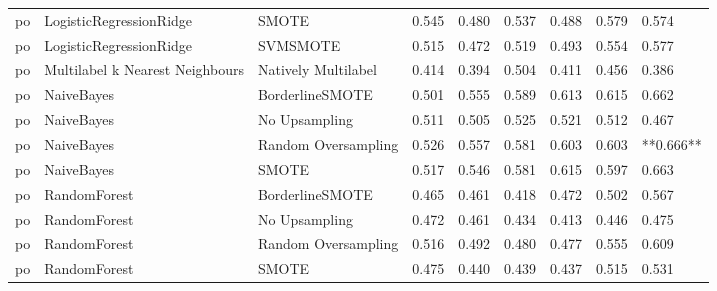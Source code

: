 \begin{tabular}{lllllllll}
      po &         LogisticRegressionRidge &                         SMOTE & 0.545 &                     0.480 &                 0.537 &                  0.488 &                                   0.579 &     0.574 \\
      po &         LogisticRegressionRidge &                      SVMSMOTE & 0.515 &                     0.472 &                 0.519 &                  0.493 &                                   0.554 &     0.577 \\
      po & Multilabel k Nearest Neighbours &           Natively Multilabel & 0.414 &                     0.394 &                 0.504 &                  0.411 &                                   0.456 &     0.386 \\
      po &                      NaiveBayes &               BorderlineSMOTE & 0.501 &                     0.555 &                 0.589 &                  0.613 &                                   0.615 &     0.662 \\
      po &                      NaiveBayes &                 No Upsampling & 0.511 &                     0.505 &                 0.525 &                  0.521 &                                   0.512 &     0.467 \\
      po &                      NaiveBayes &           Random Oversampling & 0.526 &                     0.557 &                 0.581 &                  0.603 &                                   0.603 & **0.666** \\
      po &                      NaiveBayes &                         SMOTE & 0.517 &                     0.546 &                 0.581 &                  0.615 &                                   0.597 &     0.663 \\
      po &                    RandomForest &               BorderlineSMOTE & 0.465 &                     0.461 &                 0.418 &                  0.472 &                                   0.502 &     0.567 \\
      po &                    RandomForest &                 No Upsampling & 0.472 &                     0.461 &                 0.434 &                  0.413 &                                   0.446 &     0.475 \\
      po &                    RandomForest &           Random Oversampling & 0.516 &                     0.492 &                 0.480 &                  0.477 &                                   0.555 &     0.609 \\
      po &                    RandomForest &                         SMOTE & 0.475 &                     0.440 &                 0.439 &                  0.437 &                                   0.515 &     0.531 \\

\end{tabular}
